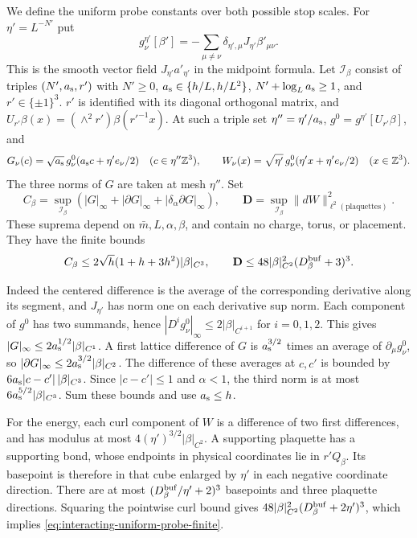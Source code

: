 \documentclass[11pt,letterpaper,reqno]{amsart}
\newcommand{\Z}{\mathbb Z}
\begin{document}
We define the uniform probe constants over both
possible stop scales. For $\eta'=L^{-N'}$ put
\[
 g_\nu^{\eta'}[\beta']
      =-\sum_{\mu\ne\nu}\delta_{\eta',\mu}J_{\eta'}\beta'_{\mu\nu}.
\]
This is the smooth vector field
$J_{\eta'}a'_{\eta'}$ in the midpoint formula.
Let $\mathcal I_\beta$ consist of triples
$(N',a_{\rm s},r')$ with
$N'\ge0$, $a_{\rm s}\in\{h/L,h/L^2\}$,
$N'+\log_La_{\rm s}\ge1$, and
$r'\in\{\pm1\}^3$.
$r'$ is identified with its diagonal orthogonal
matrix, and $U_{r'}\beta(x)=(\wedge^2r')\beta(r'^{-1}x)$.
At such a triple set $\eta''=\eta'/a_{\rm s}$,
$g^0=g^{\eta'}[U_{r'}\beta]$, and
\[
 G_\nu(c)=\sqrt{a_{\rm s}}\,
                  g_\nu^0(a_{\rm s}c+\eta'e_\nu/2)
                       \quad(c\in\eta''\Z^3),\qquad
 W_\nu(x)=\sqrt{\eta'}\,g_\nu^0(\eta'x+\eta'e_\nu/2)
                       \quad(x\in\Z^3).
\]
The three norms of $G$ are taken at mesh $\eta''$.
Set
\begin{equation}\label{eq:interacting-uniform-probe-constants}
 C_\beta=\sup_{\mathcal I_\beta}
              (|G|_\infty+|\partial G|_\infty+
                                    |\delta_\alpha\partial G|_\infty),
 \qquad
 \mathbf D=\sup_{\mathcal I_\beta}\|dW\|_{\ell^2(\text{plaquettes})}^2.
\end{equation}
These suprema depend on $\bar m,L,\alpha,\beta$,
and contain no charge, torus, or placement.
They have the finite bounds
\begin{equation}\label{eq:interacting-uniform-probe-finite}
 C_\beta\le2\sqrt h(1+h+3h^2)|\beta|_{C^3},
 \qquad
 \mathbf D\le48|\beta|_{C^2}^2(D_\beta^{\rm buf}+3)^3 .
\end{equation}

Indeed the centered difference is the average
of the corresponding derivative along its
segment, and $J_{\eta'}$ has norm one on
each derivative sup norm. Each component
of $g^0$ has two summands, hence
$|D^ig_\nu^0|_\infty\le2|\beta|_{C^{i+1}}$ for
$i=0,1,2$. This gives
$|G|_\infty\le2a_{\rm s}^{1/2}|\beta|_{C^1}$.
A first lattice difference of $G$ is
$a_{\rm s}^{3/2}$ times an average of
$\partial_\mu g_\nu^0$, so
$|\partial G|_\infty\le2a_{\rm s}^{3/2}|\beta|_{C^2}$.
The difference of these averages at $c,c'$
is bounded by
$6a_{\rm s}|c-c'|\,|\beta|_{C^3}$.
Since $|c-c'|\le1$ and $\alpha<1$,
the third norm is at most
$6a_{\rm s}^{5/2}|\beta|_{C^3}$.
Sum these bounds and use $a_{\rm s}\le h$.

For the energy, each curl component of $W$
is a difference of two first differences,
and has modulus at most
$4(\eta')^{3/2}|\beta|_{C^2}$.
A supporting plaquette has a supporting
bond, whose endpoints in physical coordinates
lie in $r'Q_\beta$.
Its basepoint is therefore in that cube
enlarged by $\eta'$ in each negative
coordinate direction. There are at most
$(D_\beta^{\rm buf}/\eta'+2)^3$ basepoints
and three plaquette directions. Squaring
the pointwise curl bound gives
$48|\beta|_{C^2}^2(D_\beta^{\rm buf}+2\eta')^3$,
which implies \eqref{eq:interacting-uniform-probe-finite}.
\end{document}
